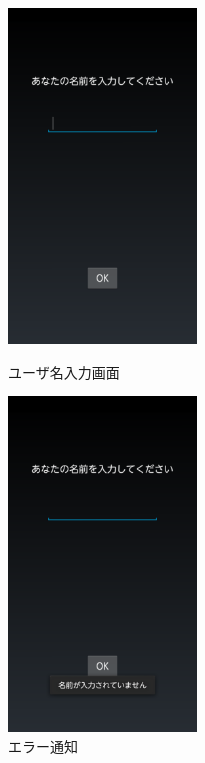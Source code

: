 \documentclass[12pt]{jreport}
\begin{document}
        \begin{figure}[tbhp]
            \begin{minipage}{0.33\hsize}
                \begin{center}
                    \includegraphics[width=5cm, bb=0 0 540 960]{NameInput.pdf}
                \end{center}
                \caption{ユーザ名入力画面}
                \label{nameInput}
            \end{minipage}
            \begin{minipage}{0.33\hsize}
                \begin{center}
                    \includegraphics[width=5cm, bb=0 0 540 960]{NameInputError.pdf}
                \end{center}
                \caption{エラー通知}
                \label{nameInputError}
            \end{minipage}

\end{figure}
\end{document}
